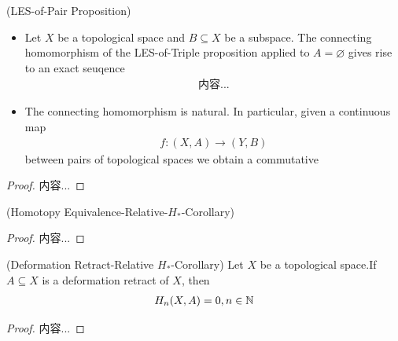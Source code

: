 \documentclass[Total.tex]{subfiles}
\begin{document}
			\begin{proposition}
				(LES-of-Pair Proposition)
				\begin{itemize}
					\item Let $X$ be a topological space and $B\subseteq X$ be a subspace. The connecting homomorphism of the LES-of-Triple proposition applied to $A=\varnothing$ gives rise to an exact seuqence
					\begin{gather*}
						内容...
					\end{gather*}
					\item The connecting homomorphism is natural. In particular, given a continuous map
					\begin{gather*}
						f:(X,A)\rightarrow (Y,B)
					\end{gather*}
					between pairs of topological spaces we obtain a commutative
					\begin{center}
					\end{center}
				\end{itemize}
			\end{proposition}
			\begin{proof}
				内容...
			\end{proof}
			
			\begin{corollary}
				(Homotopy Equivalence-Relative-$H_*$-Corollary) 
			\end{corollary}
			\begin{proof}
				内容...
			\end{proof}
			
			\begin{corollary}
				(Deformation Retract-Relative $H_*$-Corollary) Let $X$ be a topological space.If $A\subseteq X$ is a deformation retract of $X$, then
				\begin{gather*}
					H_n(X,A)=0,n\in \mathbb{N}
				\end{gather*}
			\end{corollary}
			\begin{proof}
				内容...
			\end{proof}
\end{document}
